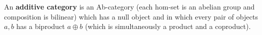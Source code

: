 An \textbf{additive category} is an Ab-category (each hom-set is an abelian group and composition is bilinear) which has a null object and in which every pair of objects $a, b$ has a biproduct $a \oplus b$ (which is simultaneously a product and a coproduct).